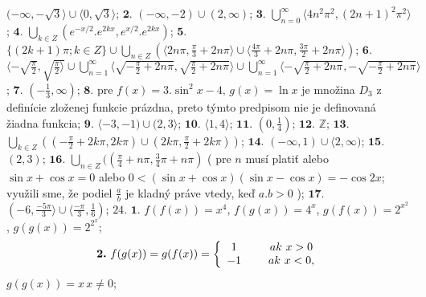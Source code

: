 $ (- \infty , - \sqrt{3}\rangle \cup \langle 0 , \sqrt{3}\rangle $;
$\boldsymbol{2.}$
$ (- \infty , -2 ) \cup ( 2 , \infty) $;
$\boldsymbol{3.}$
$\bigcup\limits_{n=0}^\infty \langle 4 n^{2} \pi ^{2}, (2n+1)^{2} \pi ^{2}\rangle $;
$\boldsymbol{4.}$
$\bigcup\limits_{k \in Z} (e^{-x/2}.e^{2kx},e^{x/2}.e^{2kx}) $;
$\boldsymbol{5.}$
$ \lbrace (2k + 1) \pi  ; k \in Z  \rbrace \cup \bigcup\limits_{n  \in Z} (\langle 2n  \pi , \frac{\pi}{3} + 2n \pi\rangle \cup \langle \frac{4 \pi}{3}+2n \pi , \frac{3 \pi}{2} + 2n \pi \rangle) $;
$\boldsymbol{6.}$
$ \langle - \sqrt{ \frac{ \pi}{2}},\sqrt{ \frac{ \pi}{2} \rangle} \cup \bigcup\limits_{n=1}^\infty  
\langle  \sqrt{- \frac{ \pi}{2}+ 2n \pi} ,  \sqrt{\frac{ \pi}{2}+ 2n \pi}\rangle \cup \bigcup\limits_{n=1}^\infty  
 \langle -\sqrt{ \frac{ \pi}{2}+ 2n \pi} , -\sqrt{-\frac{ \pi}{2}+ 2n \pi}\rangle $;
 $\boldsymbol{7.}$
 $ (- \frac{1}{3}, \infty) $;
 $\boldsymbol{8.}$
 pre $ f(x) =3. \sin^{2}x - 4, \, g(x)= \ln x $ je množina $ D_{3} $ z definície zloženej funkcie prázdna, preto týmto predpisom nie je definovaná žiadna funkcia; 
 $\boldsymbol{9.}$
 $ \langle -3, -1) \cup (2, 3\rangle $;
 $\boldsymbol{10.}$
 $ \langle 1, 4 \rangle $;
 $\boldsymbol{11.}$ 
 $ (0, \frac{1}{4}) $;
 $\boldsymbol{12.}$
 $ \mathbb{Z} $;
 $\boldsymbol{13.}$
 $ \bigcup\limits_{k \in Z} ((- \frac{\pi}{2}+ 2k \pi, 2k \pi) \cup ( 2k \pi, \frac{\pi}{2}+ 2k \pi)) $;
 $\boldsymbol{14.}$
 $ (- \infty, 1) \cup \langle 2, \infty) $;
 $\boldsymbol{15.}$
 $ (2,3) $;
 $\boldsymbol{16.}$
 $ \bigcup\limits_{n \in Z} (( \frac{\pi}{4}+ n \pi,  \frac{3}{4} \pi + n \pi) $ ( pre $n$ musí platiť alebo $ \sin x + \cos x = 0 $ alebo $ 0 < (\sin x + \cos x)(\sin x - \cos x)= - \cos 2x $; využili sme, že podiel $ \frac{a}{b} $ je kladný práve vtedy, keď $ a.b > 0 $ ); 
 $\boldsymbol{17.}$
 $ (-6,\frac{-5 \pi}{3}\rangle \cup \langle \frac{- \pi}{3}, \frac{1}{6 }) $; 
 $\boxed{24.}$ 
 $\boldsymbol{1.}$
$ f(f(x)) = x^{4} $, $ f(g(x)) = 4^{x} $, $ g(f(x)) = 2^{x^{2}} $, $ g(g(x)) = 2^{2^{x}} $;\\
\begin{align*} 
\boldsymbol{2.}\ f(g(x))= g(f(x))= \left\{ \begin{array}{cc} 
                1 & \hspace{5mm} ak\ x > 0 \\
                -1 & \hspace{5mm} ak\ x < 0 , \\
                \end{array} \right.
\end{align*}
$ g(g(x))= x \, x \ne 0 $; \\
